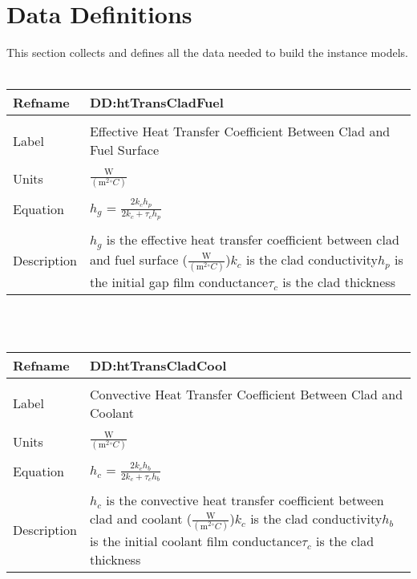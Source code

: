 \documentclass[12pt]{article}
\begin{document}
\section{Data Definitions}
\label{Sec:DataDefi}
This section collects and defines all the data needed to build the instance models.
~\newline
\noindent \begin{minipage}{\textwidth}
\begin{tabular}{p{} p{}}
\toprule \textbf{Refname} & \textbf{DD:htTransCladFuel}
\label{DD:htTransCladFuel}
\\ \midrule \\
Label & Effective Heat Transfer Coefficient Between Clad and Fuel Surface
\\ \midrule \\
Units & $\frac{\text{W}}{(\text{m}^{2}{}^{\circ}C)}$
\\ \midrule \\
Equation & ${h_{g}}$ = $\frac{2{k_{c}}{h_{p}}}{2{k_{c}}+{\tau{}_{c}}{h_{p}}}$
\\ \midrule \\
Description & ${h_{g}}$ is the effective heat transfer coefficient between clad and fuel surface ($\frac{\text{W}}{(\text{m}^{2}{}^{\circ}C)}$)\newline${k_{c}}$ is the clad conductivity\newline${h_{p}}$ is the initial gap film conductance\newline${\tau{}_{c}}$ is the clad thickness
\\ \bottomrule \end{tabular}
\end{minipage}\\
~\newline
\noindent \begin{minipage}{\textwidth}
\begin{tabular}{p{} p{}}
\toprule \textbf{Refname} & \textbf{DD:htTransCladCool}
\label{DD:htTransCladCool}
\\ \midrule \\
Label & Convective Heat Transfer Coefficient Between Clad and Coolant
\\ \midrule \\
Units & $\frac{\text{W}}{(\text{m}^{2}{}^{\circ}C)}$
\\ \midrule \\
Equation & ${h_{c}}$ = $\frac{2{k_{c}}{h_{b}}}{2{k_{c}}+{\tau{}_{c}}{h_{b}}}$
\\ \midrule \\
Description & ${h_{c}}$ is the convective heat transfer coefficient between clad and coolant ($\frac{\text{W}}{(\text{m}^{2}{}^{\circ}C)}$)\newline${k_{c}}$ is the clad conductivity\newline${h_{b}}$ is the initial coolant film conductance\newline${\tau{}_{c}}$ is the clad thickness
\\ \bottomrule \end{tabular}
\end{minipage}\\
\end{document}
